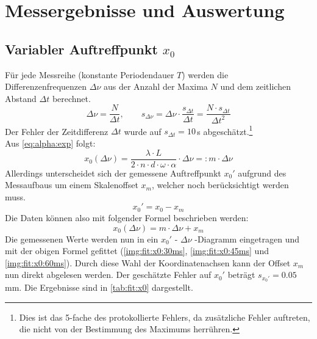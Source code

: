 \section{Messergebnisse und Auswertung}
\subsection{Variabler Auftreffpunkt \texorpdfstring{$x_0$}{x0}}
Für jede Messreihe (konstante Periodendauer $T$) werden die Differenzenfrequenzen $\Delta \nu$ aus der Anzahl der Maxima $N$ und dem zeitlichen 
Abstand $\Delta t$ berechnet.
\begin{equation}
  \label{eq:delta_nu}
  \Delta \nu = \frac{N}{\Delta t}, \qquad s_{\Delta \nu} = \Delta \nu \cdot \frac{s_{\Delta t}}{\Delta t} = \frac{N \cdot s_{\Delta t}}{\Delta t^2}
\end{equation}
Der Fehler der Zeitdifferenz $\Delta t$ wurde auf $s_{\Delta t} = 10$\,\textmu s abgeschätzt.\footnote{Dies ist das 5-fache des protokollierte Fehlers, da 
zusätzliche Fehler auftreten, die nicht von der Bestimmung des Maximums herrühren.} \\
Aus \autoref{eq:alpha:exp} folgt:
\begin{equation}
  \label{eq:x0:m}
  x_0(\Delta \nu) = \frac{\lambda \cdot L}{2 \cdot n \cdot d \cdot \omega \cdot \alpha} \cdot \Delta \nu =: m \cdot \Delta \nu
\end{equation}
Allerdings unterscheidet sich der gemessene Auftreffpunkt $x_0'$ aufgrund des Messaufbaus um einem Skalenoffset $x_m$, 
welcher noch berücksichtigt werden muss.
\begin{equation}
  x_0' = x_0 - x_m
\end{equation}
Die Daten können also mit folgender Formel beschrieben werden:
\begin{equation}
  x_0(\Delta \nu) = m \cdot \Delta \nu + x_m
\end{equation}
Die gemessenen Werte werden nun in ein $x_0'$ - $\Delta \nu$ -Diagramm eingetragen und mit der obigen Formel gefittet 
(\autoref{img:fit:x0:30ms}, \autoref{img:fit:x0:45ms} und \autoref{img:fit:x0:60ms}). Durch diese Wahl der Koordinatenachsen kann der Offset $x_m$ 
nun direkt abgelesen werden.
Der geschätzte Fehler auf $x_0'$ beträgt $s_{x_0'} = 0.05$\,mm. Die Ergebnisse sind in \autoref{tab:fit:x0} dargestellt.

